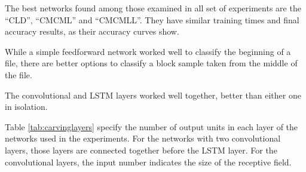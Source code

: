The best networks found among those examined in all set of experiments are the ``CLD'', ``CMCML'' and ``CMCMLL''. They have similar training times and final accuracy results, as their accuracy curves show. 

While a simple feedforward network worked well to classify the beginning of a file, there are better options to classify a block sample taken from the middle of the file.

The convolutional and LSTM layers worked well together, better than either one in isolation.

Table \ref{tab:carvinglayers} specify the number of output units in each layer of the networks used in the experiments. For the networks with two convolutional layers, those layers are connected together before the LSTM layer. For the convolutional layers, the input number indicates the size of the receptive field. 

